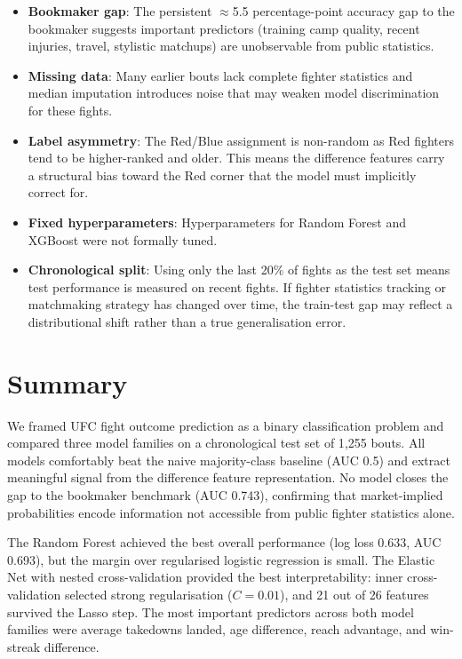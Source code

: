 \documentclass{article}
\begin{document}
\begin{itemize}
  \item \textbf{Bookmaker gap}: The persistent $\approx$5.5 percentage-point
  accuracy gap to the bookmaker suggests important predictors (training camp
  quality, recent injuries, travel, stylistic matchups) are unobservable
  from public statistics.
  \item \textbf{Missing data}: Many earlier bouts lack complete fighter
  statistics and median imputation introduces noise that may weaken model
  discrimination for these fights.
  \item \textbf{Label asymmetry}: The Red/Blue assignment is non-random as
  Red fighters tend to be higher-ranked and older.
  This means the difference features carry a structural bias toward the
  Red corner that the model must implicitly correct for.
  \item \textbf{Fixed hyperparameters}: Hyperparameters for Random Forest
  and XGBoost were not formally tuned.
  \item \textbf{Chronological split}: Using only the last 20\% of fights as
  the test set means test performance is measured on recent fights.
  If fighter statistics tracking or matchmaking strategy has changed over
  time, the train-test gap may reflect a distributional shift rather than
  a true generalisation error.
\end{itemize}

\section{Summary}

We framed UFC fight outcome prediction as a binary classification problem
and compared three model families on a chronological test set of 1{,}255
bouts.
All models comfortably beat the naive majority-class baseline (AUC 0.5) and
extract meaningful signal from the difference feature representation.
No model closes the gap to the bookmaker benchmark (AUC 0.743), confirming
that market-implied probabilities encode information not accessible from
public fighter statistics alone.

The Random Forest achieved the best overall performance (log loss 0.633,
AUC 0.693), but the margin over regularised logistic regression is small.
The Elastic Net with nested cross-validation provided the best
interpretability: inner cross-validation selected strong regularisation
($C = 0.01$), and 21 out of 26 features survived the Lasso step.
The most important predictors across both model families were average
takedowns landed, age difference, reach advantage, and win-streak difference.
\end{document}
